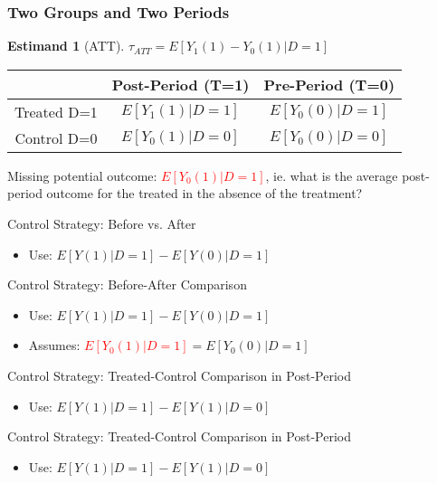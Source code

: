 \documentclass{beamer}
\numberwithin{equation}{section}
\newtheorem{estm}{Estimand}
\begin{document}
\begin{frame}
  \frametitle{Two Groups and Two Periods}
  \begin{estm}[ATT]
$\tau_{ATT}=E[Y_{1}(1)-Y_{0}(1)|D=1]$
\end{estm}
\begin{center}
\begin{tabular}{|c|c|c|}
\hline
    {\bf } & {\bf Post-Period (T=1)} & {\bf Pre-Period (T=0)} \\
\hline
\multirow{2}{*}{Treated D=1}  & \multirow{2}{*}{$E[Y_1(1)|D=1]$} & \multirow{2}{*}{$E[Y_0(0)|D=1]$}  \\
 & &  \\
\hline
\multirow{2}{*}{Control D=0}  & \multirow{2}{*}{$E[Y_0(1)|D=0]$} & \multirow{2}{*}{$E[Y_0(0)|D=0]$}  \\
 & &  \\
\hline
\end{tabular}
\end{center}
\begin{overprint}
\begin{problem}
Missing potential outcome: \textcolor{red}{$E[Y_0(1)|D=1]$}, ie. what is the average post-period outcome for the treated in the absence of the treatment?
\end{problem}
Control Strategy: Before vs. After\begin{itemize}
\item Use: $E[Y(1)|D=1]-E[Y(0)|D=1]$
\end{itemize}
Control Strategy: Before-After Comparison\begin{itemize}
\item Use: $E[Y(1)|D=1]-E[Y(0)|D=1]$
\item Assumes: \textcolor{red}{$E[Y_0(1)|D=1]$}$=E[Y_0(0)|D=1]$
\end{itemize}
Control Strategy: Treated-Control Comparison in Post-Period\begin{itemize}
\item Use: $E[Y(1)|D=1]-E[Y(1)|D=0]$
\end{itemize}
Control Strategy: Treated-Control Comparison in Post-Period\begin{itemize}
\item Use: $E[Y(1)|D=1]-E[Y(1)|D=0]$

\end{itemize}
\end{overprint}
\end{frame}
\end{document}
